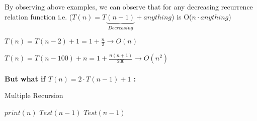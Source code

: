 \documentclass[]{article}
\theoremstyle{plain}
\theoremstyle{definition}
\begin{document}
    By observing above examples, we can observe that for any decreasing recurrence relation function i.e. ($T(n) = T\underbrace{(n-1)}_{Decreasing} + anything$) is O($n \cdot anything$)

$T(n) = T(n-2) + 1 = 1 + \frac{n}{2} \longrightarrow O(n) $

$T(n) = T(n-100) + n = 1 + \frac{n(n+1)}{200} \longrightarrow O(n^2) $
\\\\
\textbf{But what if $T(n) = 2 \cdot T(n -1) + 1$ :}
\begin{algorithm}[H]
    \caption{Multiple Recursion}
    \label{printRecursion}
    \begin{algorithmic}
         
            \State$print(n)$ 
            \State$Test(n-1)$  
            \State$Test(n-1)$  
        \EndIf
        \EndProcedure
    \end{algorithmic}
\end{algorithm}
\end{document}

